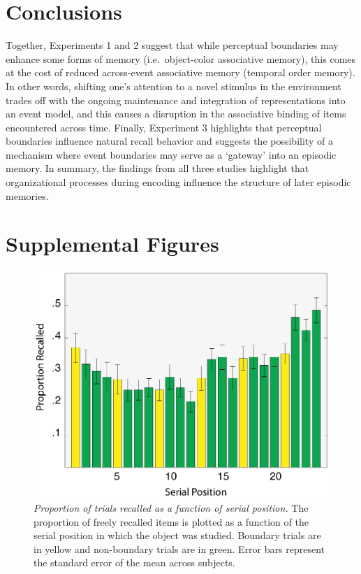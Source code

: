 \section{Conclusions}\label{conclusions}

Together, Experiments 1 and 2 suggest that while perceptual boundaries
may enhance some forms of memory (i.e.~object-color associative memory),
this comes at the cost of reduced across-event associative memory
(temporal order memory). In other words, shifting one's attention to a
novel stimulus in the environment trades off with the ongoing
maintenance and integration of representations into an event model, and
this causes a disruption in the associative binding of items encountered
across time. Finally, Experiment 3 highlights that perceptual boundaries
influence natural recall behavior and suggests the possibility of a
mechanism where event boundaries may serve as a `gateway' into an
episodic memory. In summary, the findings from all three studies
highlight that organizational processes during encoding influence the
structure of later episodic memories.

\section{Supplemental Figures}\label{supplemental-figures}

\begin{figure}
  \centering
  \includegraphics[width=\textwidth]{figures/chapter1_suppfigure1.eps}
  \caption[Behavioral Experiment 3: Proportion of trials recalled by serial position]{\textit{Proportion of trials recalled as a function of serial position.} The proportion of freely recalled items is plotted as a function of the serial position in which the object was studied.  Boundary trials are in yellow and non-boundary trials are in green.  Error bars represent the standard error of the mean across subjects.}
  \label{chapter1_suppfigure1}
\end{figure}

